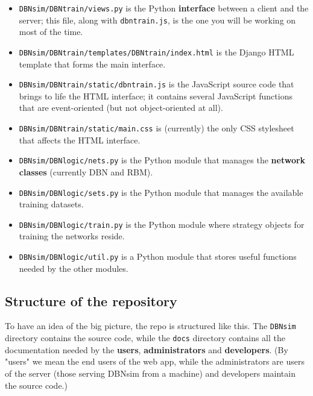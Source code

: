 \documentclass[a4paper]{article}
\begin{document}
	\begin{itemize}
		
			
	\item \texttt{DBNsim/DBNtrain/views.py} is the Python \textbf{interface} between a client and the server; this file, along with \texttt{dbntrain.js}, is the one you will be working on most of the time.
			
	\item \texttt{DBNsim/DBNtrain/templates/DBNtrain/index.html} is the Django HTML template that forms the main interface.
			
	\item \texttt{DBNsim/DBNtrain/static/dbntrain.js} is the JavaScript source code that brings to life the HTML interface; it contains several JavaScript functions that are event-oriented (but not object-oriented at all).
			
	\item \texttt{DBNsim/DBNtrain/static/main.css} is (currently) the only CSS stylesheet that affects the HTML interface.
			
	\item \texttt{DBNsim/DBNlogic/nets.py} is the Python module that manages the \textbf{network classes} (currently DBN and RBM).
			
	\item \texttt{DBNsim/DBNlogic/sets.py} is the Python module that manages the available training datasets.
			
	\item \texttt{DBNsim/DBNlogic/train.py} is the Python module where strategy objects for training the networks reside.
			
	\item \texttt{DBNsim/DBNlogic/util.py} is a Python module that stores useful functions needed by the other modules.
		
	\end{itemize}


		
	\subsection{Structure of the repository}

		
To have an idea of the big picture, the repo is structured like this. The \texttt{DBNsim} directory contains the source code, while the \texttt{docs} directory contains all the documentation needed by the \textbf{users}, \textbf{administrators} and \textbf{developers}. (By "users" we mean the end users of the web app, while the administrators are users of the server (those serving DBNsim from a machine) and developers maintain the source code.)
		
\end{document}
